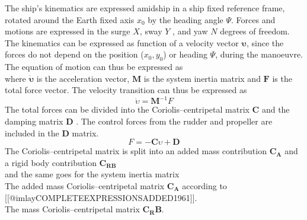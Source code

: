 The ship’s kinematics are expressed amidship in a ship fixed reference frame, rotated around the Earth fixed axis $x_0$ by the heading angle $\Psi$. Forces and motions are expressed in the surge $X$, sway $Y$ , and yaw $N$ degrees of freedom. The kinematics can be expressed as function of a velocity vector $\mathbf{\upsilon}$, since the forces do not depend on the position ($x_0,y_0$) or heading $\Psi$, during the manoeuvre.
\begin{equation}
    \label{eq:upsilon}
    
\end{equation}
The equation of motion can thus be expressed as
\begin{equation}
    \label{eq:upsilon1d}
    
\end{equation}
where $\mathbf{\dot{\upsilon}}$ is the acceleration vector, $\mathbf{M}$ is the system inertia matrix and $\mathbf{F}$ is the total force vector.
The velocity transition can thus be expressed as
\begin{equation}
    \label{eq:acc}
    \dot{\upsilon} = \mathbf{M}^{-1}F
\end{equation}
The total forces can be divided into the Coriolis–centripetal matrix $\mathbf{C}$ and the damping matrix $\mathbf{D}$ \citep{fossen_handbook_2021}. The control forces from the rudder and propeller are included in the $\mathbf{D}$ matrix.
\begin{equation}
    \label{eq:upsilon1d}
F = - \mathbf{C} \upsilon + \mathbf{D}
\end{equation}
The Coriolis–centripetal matrix is split into an added mass contribution $\mathbf{C_A}$ and a rigid body contribution $\mathbf{C_{RB}}$
\begin{equation}
    \label{eq:C}
    
\end{equation}
and the same goes for the system inertia matrix
\begin{equation}
    \label{eq:M}
    
\end{equation}
The added mass Coriolis–centripetal matrix $\mathbf{C_A}$ according to [[@imlayCOMPLETEEXPRESSIONSADDED1961]].
\begin{equation}
    \label{eq:C_A}
    
\end{equation}
The mass Coriolis–centripetal matrix $\mathbf{C_RB}$.
\begin{equation}
    \label{eq:C_RB}
    
\end{equation}
